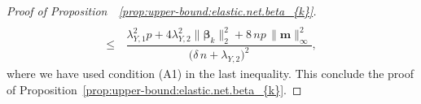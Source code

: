 \documentclass[
  12pt]{article}
\def\M{\mathbf{m}}
\begin{document}
\begin{proof}[Proof of Proposition~~\ref{prop:upper-bound:elastic.net.beta_{k}}]
\begin{align*}
		\\
		\leq  &  \,  
		\dfrac{ \lambda_{Y,1}^{2} p  +  4  \lambda_{Y,2}^{2}   \big\| \bm{\beta}_{k}   \big\|_{2}^{2}  +     8 \,n p  \,     \big\| \M \big\|^2_{\infty} 
		}{ \big( \delta \,  n  +   \lambda_{Y,2}  \big)^{2} },
	\end{align*} 
	where we have used condition (A1) in the last inequality.  This conclude the proof of Proposition~\ref{prop:upper-bound:elastic.net.beta_{k}}. 
\end{proof}   
\end{document}
